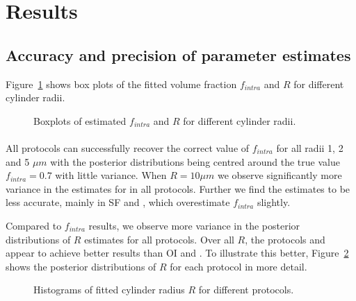 \FloatBarrier

\section{Results}
\subsection{Accuracy and precision of parameter estimates}
Figure~\ref{fig:chapter7 exp1 boxplots 60mT} shows box plots of the fitted volume fraction $f_{intra}$ and $R$ for different cylinder radii.
\begin{figure}[H]
	\centering
	
	
	\caption{Boxplots of estimated $f_{intra}$ and $R$ for different cylinder radii.}
	\label{fig:chapter7 exp1 boxplots 60mT}
\end{figure}


\paragraph{} All protocols can successfully recover the correct value of $f_{intra}$ for all radii 1, 2 and 5 $\mu m$ with the posterior distributions being centred around the true value $f_{intra}=0.7$ with little variance. When $R=10\mu m$ we observe significantly more variance in the estimates for in all protocols. Further we find the estimates to be less accurate, mainly in {\gls{SF}} and {\SD}, which overestimate $f_{intra}$ slightly.


Compared to $f_{intra}$ results, we observe more variance in the posterior distributions of $R$ estimates for all protocols. Over all $R$, the protocols {\DO} and {\FD} appear to achieve better results than {\gls{OI}} and {\SD}. To illustrate this better, Figure~\ref{fig:chapter7 exp1 histograms 60mT} shows the posterior distributions of $R$ for each protocol in more detail.

\begin{figure}[H]
	 \centering
	 
	 \caption{Histograms of fitted cylinder radius $R$ for different protocols.}
	 \label{fig:chapter7 exp1 histograms 60mT}
\end{figure}

